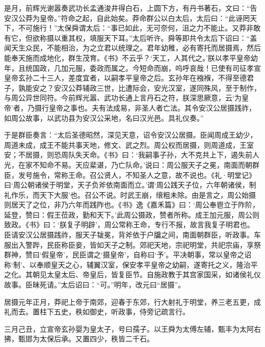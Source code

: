 \documentclass[12pt,UTF8]{ctexbook}
\begin{document}
是月，前辉光谢嚣奏武功长孟通浚井得白石，上圆下方，有丹书著石，文曰：“告安汉公莽为皇帝。”符命之起，自此始矣。莽命群公以白太后，太后曰：“此诬罔天下，不可施行！”太保舜谓太后：“事已如此，无可奈何，沮之力不能止。又莽非敢有它，但欲称摄以重其权，填服天下耳。”太后听许。舜等即共令太后下诏曰：“盖闻天生众民，不能相治，为之立君以统理之。君年幼稚，必有寄托而居摄焉，然后能奉天施而成地化，群生茂育。《书》不云乎？‘天工，人其代之。’朕以孝平皇帝幼年，且统国政，几加元服，委政而属之。今短命而崩，呜呼哀哉！已使有司征孝宣皇帝玄孙二十三人，差度宜者，以嗣孝平皇帝之后。玄孙年在襁褓，不得至德君子，孰能安之？安汉公莽辅政三世，比遭际会，安光汉室，遂同殊风，至于制作，与周公异世同符。今前辉光嚣、武功长通上言丹石之符，朕深思厥意，云‘为皇帝’者，乃摄行皇帝之事也。夫有法成易，非圣人者亡法。其令安汉公居摄践祚，如周公故事，以武功县为安汉公采地，名曰汉光邑。具礼仪奏。”



于是群臣奏言：“太后圣德昭然，深见天意，诏令安汉公居摄。臣闻周成王幼少，周道未成，成王不能共事天地，修文、武之烈。周公权而居摄，则周道成，王室安；不居摄，则恐周队失天命。《书》曰：‘我嗣事子孙，大不克共上下，遏失前人光，在家不知命不易。天应棐谌，乃亡队命。’说曰：周公服天子之冕，南面而朝群臣，发号施令，常称王命。召公贤人，不知圣人之意，故不说也。《礼·明堂记》曰‘周公朝诸侯于明堂，天子负斧依南面而立。’谓‘周公践天子位，六年朝诸侯，制礼作乐，而天下大服’也。召公不说。时武王崩，缞粗未除。由是言之，周公始摄则居天了之位，非乃六年而践阼也。《书》逸《嘉禾篇》曰：‘周公奉鬯立于阼阶，延登，赞曰：假王莅政，勤和天下。’此周公摄政，赞者所称。成王加元服，周公则致政。《书》曰：‘朕复子明辟’，周公常称王命，专行不报，故言我复子明君也。臣请安汉公居摄践祚，服天子韨冕，背斧依于户牖之间，南面朝群臣，听政事。车服出入警跸，民臣称臣妾，皆如天子之制。郊祀天地，宗祀明堂，共祀宗庙，享祭群神，赞曰‘假皇帝’，民臣谓之‘摄皇帝’，自称曰‘予’。平决朝事，常以皇帝之诏称‘制’、以奉顺皇天之心，辅翼汉室，保安孝平皇帝之幼嗣，遂寄托之义，隆治平之化。其朝见太皇太后、帝皇后，皆复臣节。自施政教于其宫家国采，如诸侯礼仪故事。臣昧死请。”太后诏曰：“可。”明年，改元曰“居摄”。



居摄元年正月，莽祀上帝于南郊，迎春于东郊，行大射礼于明堂，养三老五更，成礼而去。置柱下五史，秩如御史，听政事，侍旁记疏言行。



三月己丑，立宣帝玄孙婴为皇太子，号曰孺子。以王舜为太傅左辅，甄丰为太阿右拂，甄邯为太保后承。又置四少，秩皆二千石。
\end{document}
